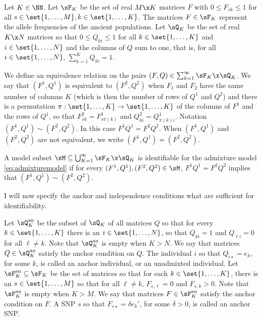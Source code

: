 \documentclass[12pt,a4paper]{article}
\begin{document}
Let $K\in\NN$. 
Let $\sF_K$ be the set of real $M\x K$ matrices $F$ with $0\le F_{sk}\le 1$ for all $s\in\set{1,\ldots,M}, k\in\set{1,\ldots,K}$. 
The matrices $F\in\sF_K$ represent the allele frequencies of the ancient populations. 
Let $\sQ_K$ be the set of real $K\x N$ matrices so that $0\le Q_{ki}\le 1$ for all $k\in\set{1,\ldots,K}$ and $i\in\set{1,\ldots,N}$ and the columns of $Q$ sum to one, that is, 
for all $i\in\set{1,\ldots,N}$, $\sum_{k=1}^KQ_{ki}=1$. 

We define an equivalence relation on the pairs $(F,Q)\in \sum_{k=1}^\infty \sF_K\x \sQ_K$. We say that $(F^1,Q^1)$ is equivalent to $(F^2,Q^2)$ when $F_1$ and $F_2$ have the same number of columns $K$ (which is then the number of rows of $Q^1$ and $Q^2$) and there is a permutation $\pi:\set{1,\ldots,K}\to\set{1,\ldots,K}$ of the columns of $F^1$ and the rows of $Q^1$, 
so that $F^2_{sk}=F^1_{s\pi(k)}$ and $Q^2_{ki}=Q^1_{\pi(k)i}$. Notation $(F^1,Q^1)\sim (F^2,Q^2)$. In this case $F^1Q^1=F^2Q^2$. 
When $(F^1,Q^1)$ and $(F^2,Q^2)$ are not equivalent, we write $(F^1,Q^1)\not\sim (F^2,Q^2)$. 

\begin{definition}
    A model subset $\sM\subseteq \bigcup_{K=1}^\infty \sF_K\x \sQ_K$ is identifiable for the admixture model \cref{eq:admixturemodel} if for every $(F^1,Q^1),(F^2,Q^2)\in \sM$, 
    $F^1Q^1=F^2Q^2$ implies that $(F^1,Q^1)\sim (F^2,Q^2)$. 
\end{definition}




 I will now specify the anchor and independence conditions what are sufficient for identifiability. 
 
 Let $\sQ_K^{\text{an}}$ be the subset of $\sQ_K$ of all matrices $Q$ so that for every $k\in\set{1,\ldots, K}$ there is an $i\in\set{1,\ldots,N}$, so that $Q_{ki}=1$ and $Q_{\ell i}=0$ for all $\ell\neq k$. Note that $\sQ_K^{\text{an}}$ is empty when $K>N$.  We say that matrices $Q\in \sQ_K^{\text{an}}$ satisfy the anchor condition on $Q$. The individual $i$ so that  $Q_{i\star}=e_k$, for some $k$, is called an anchor individual, or an unadmixted individual.   
Let $\sF_K^{\text{an}}\subseteq \sF_K $ be the set of matrices so that for each $k\in\set{1,\ldots,K}$, there is an $s\in\set{1,\ldots,M}$ so that for all $\ell\neq k$, $F_{s,\ell}=0$ and $F_{s,k}>0$. Note that $\sF_K^{\text{an}}$ is empty when $K>M$. We say that matrices $F\in \sF_K^{\text{an}}$ satisfy the anchor condition on $F$. A SNP $s$ so that $F_{s\star} = \delta e_k'$, for some $\delta>0$, is called an anchor SNP. %
\end{document}
